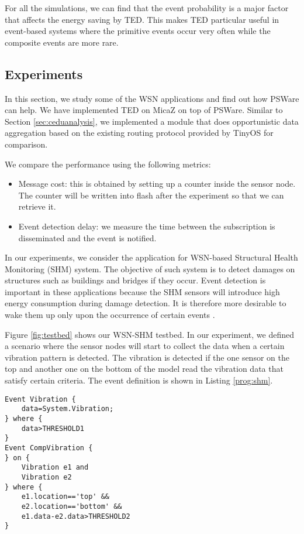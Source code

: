 For all the simulations, we can find that the event probability is a major factor that affects the energy saving by TED. This makes TED particular useful in event-based systems where the primitive events occur very often while the composite events are more rare.

\subsection{Experiments}
\label{sec:experiments}
In this section, we study some of the WSN applications and find out how PSWare can help. We have implemented TED on MicaZ on top of PSWare. Similar to Section \ref{sec:ceduanalysis}, we implemented a module that does opportunistic data aggregation based on the existing routing protocol provided by TinyOS for comparison.

We compare the performance using the following metrics:
\begin{itemize}
\item Message cost: this is obtained by setting up a counter inside the sensor node. The counter will be written into flash after the experiment so that we can retrieve it.
\item Event detection delay: we measure the time between the subscription is disseminated and the event is notified.
\end{itemize}

In our experiments, we consider the application for WSN-based Structural Health Monitoring (SHM) system. The objective of such system is to detect damages on structures such as buildings and bridges if they occur. Event detection is important in these applications because the SHM sensors will introduce high energy consumption during damage detection. It is therefore more desirable to wake them up only upon the occurrence of certain events \cite{jangshm}.

Figure \ref{fig:testbed} shows our WSN-SHM testbed. In our experiment, we defined a scenario where the sensor nodes will start to collect the data when a certain vibration pattern is detected. The vibration is detected if the one sensor on the top and another one on the bottom of the model read the vibration data that satisfy certain criteria. The event definition is shown in Listing \ref{prog:shm}.
\begin{lstlisting}[caption=Event definition for SHM, label=prog:shm]
Event Vibration {
	data=System.Vibration;
} where {
	data>THRESHOLD1
}
Event CompVibration {
} on {
	Vibration e1 and
	Vibration e2
} where {
	e1.location=='top' &&
	e2.location=='bottom' &&
	e1.data-e2.data>THRESHOLD2
}
\end{lstlisting}

